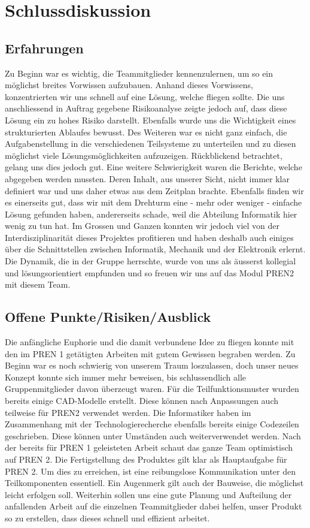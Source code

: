 \section{Schlussdiskussion}

\subsection{Erfahrungen}

Zu Beginn war es wichtig, die Teammitglieder kennenzulernen, um so ein 
möglichst breites Vorwissen aufzubauen. Anhand dieses Vorwissens, 
konzentrierten wir uns schnell auf eine Lösung, welche fliegen sollte. Die uns 
anschliessend in Auftrag gegebene Risikoanalyse zeigte jedoch auf, dass diese 
Lösung ein zu hohes Risiko darstellt. Ebenfalls wurde uns die 
Wichtigkeit eines strukturierten Ablaufes bewusst. Des Weiteren war es nicht ganz  
einfach, die Aufgabenstellung in die verschiedenen Teilsysteme zu unterteilen  
und zu diesen möglichst viele Lösungsmöglichkeiten aufzuzeigen. 
Rückblickend betrachtet, gelang uns dies jedoch gut. Eine weitere 
Schwierigkeit waren die Berichte, welche abgegeben werden mussten. 
Deren Inhalt, aus unserer Sicht, nicht immer klar definiert war und uns daher 
etwas aus dem Zeitplan brachte.
Ebenfalls finden wir es einerseits gut, dass wir mit dem Drehturm eine - mehr oder weniger - einfache Lösung gefunden haben, andererseits schade, weil die Abteilung Informatik hier wenig zu tun hat. Im Grossen und Ganzen konnten wir jedoch viel 
von der Interdisziplinarität dieses Projektes profitieren und haben deshalb 
auch einiges über die Schnittstellen zwischen Informatik, Mechanik und der Elektronik 
erlernt. Die Dynamik, die in der Gruppe herrschte, wurde von uns als äusserst kollegial und lösungsorientiert empfunden und so freuen wir uns auf das Modul PREN2 mit diesem Team.


\subsection{Offene Punkte/Risiken/Ausblick}

Die anfängliche Euphorie und die damit verbundene Idee zu fliegen konnte mit den im PREN 1 getätigten Arbeiten mit gutem Gewissen begraben werden. Zu Beginn war es noch schwierig von unserem Traum loszulassen, doch unser neues Konzept konnte sich immer mehr beweisen, bis schlussendlich alle Gruppenmitglieder davon überzeugt waren.
Für die Teilfunktionsmuster wurden bereits einige CAD-Modelle erstellt. Diese können nach Anpassungen auch teilweise für PREN2 verwendet werden. Die Informatiker haben im Zusammenhang mit der Technologierecherche ebenfalls bereits einige Codezeilen geschrieben. Diese können unter Umständen auch weiterverwendet werden.
Nach der bereits für PREN 1 geleisteten Arbeit schaut das ganze Team optimistisch auf PREN 2. Die Fertigstellung des Produktes gilt klar als Hauptaufgabe für PREN 2. Um dies zu erreichen, ist eine reibungslose Kommunikation unter den Teilkomponenten essentiell. Ein Augenmerk gilt auch der Bauweise, die möglichst leicht erfolgen soll. Weiterhin sollen uns eine gute Planung und Aufteilung der anfallenden Arbeit auf die einzelnen Teammitglieder dabei helfen, unser Produkt so zu erstellen, dass dieses schnell und effizient arbeitet.
